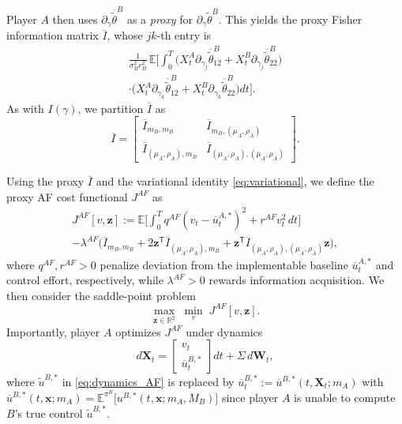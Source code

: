 \documentclass[letterpaper, 10 pt, conference]{ieeeconf}
\newcommand{\E}{\mathbb E}
\newcommand{\R}{\mathbb R}
\newcommand{\transpose}{^\mathsf{T}}
\begin{document}
Player $A$ then uses $\partial_{\gamma} \overline{\widetilde{\theta}}^B$ as a \emph{proxy} for $\partial_{\gamma} \widetilde{\theta}^B$. This yields the proxy Fisher information matrix $\overline{I}$, whose $jk$-th entry is
\begin{multline*}
    \tfrac{1}{\sigma_B^2 r_B^2}\, \E\!\Big[\int_0^T \!\big(X_t^A \partial_{\gamma_j} \overline{\widetilde{\theta}}_{12}^B + X_t^B \partial_{\gamma_j} \overline{\widetilde{\theta}}_{22}^B\big)\\
    \cdot \big(X_t^A \partial_{\gamma_k} \overline{\widetilde{\theta}}_{12}^B + X_t^B \partial_{\gamma_k} \overline{\widetilde{\theta}}_{22}^B\big) dt\Big]. 
\end{multline*}
As with $I(\gamma)$, we partition $\overline{I}$ as 
\begin{equation*}
    \overline{I} = \begin{bmatrix}
        \overline{I}_{m_B, m_B} & \overline{I}_{m_B, (\mu_A, \rho_A)} \\
        \overline{I}_{(\mu_A, \rho_A), m_B} & \overline{I}_{(\mu_A, \rho_A), (\mu_A, \rho_A)}
    \end{bmatrix}.
\end{equation*}

Using the proxy $\overline{I}$ and the variational identity \eqref{eq:variational}, we define the proxy AF cost functional $J^{AF}$ as 
\begin{multline*}
    J^{AF}[v, \bm{z}] := \E\!\Big[\int_0^T  q^{AF}(v_t - \overline{u}^{A,*}_t)^2 +  r^{AF} v_t^2 \, dt\Big] \\
    -  \lambda^{AF} \big(\overline{I}_{m_B,m_B} + 2\bm{z}\transpose \overline{I}_{(\mu_A,\rho_A),m_B} + \bm{z}\transpose \overline{I}_{(\mu_A,\rho_A),(\mu_A,\rho_A)} \bm{z}\big),
\end{multline*}
where $ q^{AF},  r^{AF} > 0$ penalize deviation from the implementable baseline $\overline{u}^{A,*}_t$ and control effort, respectively, while $ \lambda^{AF} > 0$ rewards information acquisition.  
We then consider the saddle-point problem
\begin{equation}\label{eq:saddle}
    \max_{\bm{z} \in \R^2}\; \min_{v}\; J^{AF}[v, \bm{z}].
\end{equation}
Importantly, player $A$ optimizes $J^{AF}$ under dynamics 
\begin{equation}\label{eq:dynamics_AF_playerA}
    d\bm{X}_t = \begin{bmatrix} v_t \\ \overline{u}^{B,*}_t\end{bmatrix} dt + \Sigma\, d\bm{W}_t,
\end{equation}
where $\widetilde u^{B, \ast}$ in \eqref{eq:dynamics_AF} is replaced by $ \overline{u}^{B, \ast}_t := \overline u^{B, \ast} (t,\bm X_t; m_A)$ with $\overline u^{B, \ast} (t,\bm x; m_A) = \E^{\pi^B}\big[u^{B,\ast}(t, \bm x; m_A, M_B)\big]$
since player $A$ is unable to compute $B$'s true control $\widetilde{u}^{B,\ast}$. 
\end{document}
